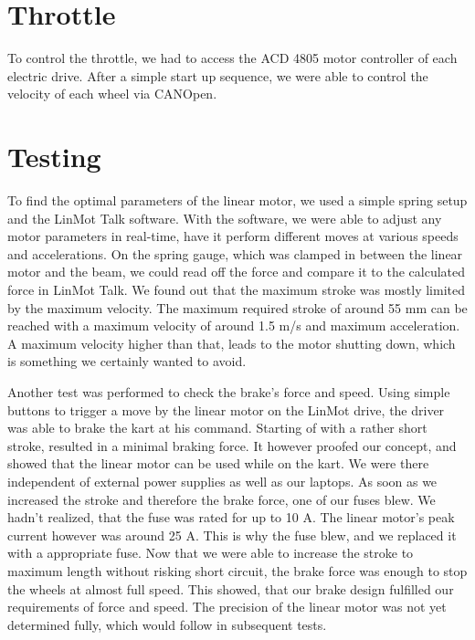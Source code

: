 \section{Throttle}

To control the throttle, we had to access the ACD 4805 motor controller of each electric drive. After a simple start up sequence, we were able to control the velocity of each wheel via CANOpen.


\section{Testing}


To find the optimal parameters of the linear motor, we used a simple spring setup and the LinMot Talk software. With the software, we were able to adjust any motor parameters in real-time, have it perform different moves at various speeds and accelerations. On the spring gauge, which was clamped in between the linear motor and the beam, we could read off the force and compare it to the calculated force in LinMot Talk. We found out that the maximum stroke was mostly limited by the maximum velocity. The maximum required stroke of around 55 mm can be reached with a maximum velocity of around 1.5 m/s and maximum acceleration. A maximum velocity higher than that, leads to the motor shutting down, which is something we certainly wanted to avoid.

Another test was performed to check the brake's force and speed. Using simple buttons to trigger a move by the linear motor on the LinMot drive, the driver was able to brake the kart at his command. Starting of with a rather short stroke, resulted in a minimal braking force. It however proofed our concept, and showed that the linear motor can be used while on the kart. We were there independent of external power supplies as well as our laptops. As soon as we increased the stroke and therefore the brake force, one of our fuses blew. We hadn't realized, that the fuse was rated for up to 10 A. The linear motor's peak current however was around 25 A. This is why the fuse blew, and we replaced it with a appropriate fuse. Now that we were able to increase the stroke to maximum length without risking short circuit, the brake force was enough to stop the wheels at almost full speed. This showed, that our brake design fulfilled our requirements of force and speed. The precision of the linear motor was not yet determined fully, which would follow in subsequent tests.